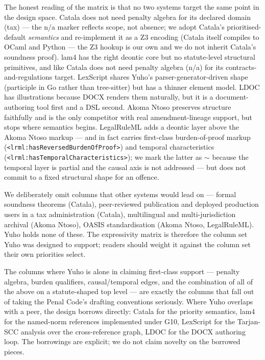 The honest reading of the matrix is that no two systems target the
same point in the design space. Catala does not need penalty algebra
for its declared domain (tax) --- the n/a marker reflects scope, not
absence; we adopt Catala's prioritised-default \emph{semantics} and
re-implement it as a Z3 encoding (Catala itself compiles to OCaml and
Python --- the Z3 hookup is our own and we do not inherit Catala's
soundness proof). lam4 has the right deontic core but no
statute-level structural primitives, and like Catala does not need
penalty algebra (n/a) for its contracts-and-regulations target.
LexScript shares Yuho's parser-generator-driven shape (participle in
Go rather than tree-sitter) but has a thinner element model. LDOC
has illustrations because DOCX renders them naturally, but it is a
document-authoring tool first and a DSL second.
Akoma Ntoso preserves structure faithfully and is the only competitor
with real amendment-lineage support, but stops where semantics begins.
LegalRuleML adds a deontic layer above the Akoma Ntoso markup --- and
in fact carries first-class burden-of-proof markup
(\texttt{<lrml:hasReversedBurdenOfProof>}) and temporal characteristics
(\texttt{<lrml:hasTemporalCharacteristics>}); we mark the latter as
$\sim$ because the temporal layer is partial and the causal axis is
not addressed --- but does not commit to a fixed structural shape for
an offence.

We deliberately omit columns that other systems would lead on ---
formal soundness theorems (Catala), peer-reviewed publication and
deployed production users in a tax administration (Catala),
multilingual and multi-jurisdiction archival (Akoma Ntoso), OASIS
standardisation (Akoma Ntoso, LegalRuleML). Yuho holds none of these.
The expressivity matrix is therefore the column set Yuho was designed
to support; readers should weight it against the column set their own
priorities select.

The columns where Yuho is alone in claiming first-class support ---
penalty algebra, burden qualifiers, causal/temporal edges, and the
combination of all of the above on a statute-shaped top level --- are
exactly the columns that fall out of taking the Penal Code's drafting
conventions seriously. Where Yuho overlaps with a peer, the design
borrows directly: Catala for the priority semantics, lam4 for the
named-norm references implemented under \textsf{G10}, LexScript for the
Tarjan-SCC analysis over the cross-reference graph, LDOC for the
DOCX authoring loop. The borrowings are explicit; we do not claim
novelty on the borrowed pieces.

